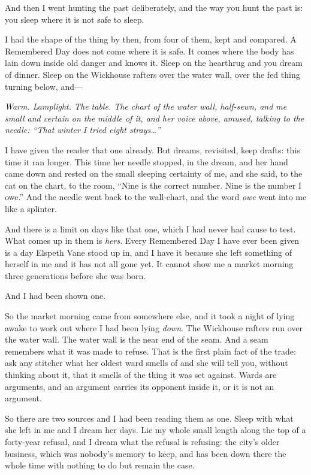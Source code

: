 \scenebreak

And then I went hunting the past deliberately, and the way you hunt the past is: you sleep where it is not safe to sleep.

I had the shape of the thing by then, from four of them, kept and compared. A Remembered Day does not come where it is safe. It comes where the body has lain down inside old danger and knows it. Sleep on the hearthrug and you dream of dinner. Sleep on the Wickhouse rafters over the water wall, over the fed thing turning below, and---

\emph{Warm. Lamplight. The table. The chart of the water wall, half-sewn, and me small and certain on the middle of it, and her voice above, amused, talking to the needle: ``That winter I tried eight strays\ldots''}

I have given the reader that one already. But dreams, revisited, keep drafts: this time it ran longer. This time her needle stopped, in the dream, and her hand came down and rested on the small sleeping certainty of me, and she said, to the cat on the chart, to the room, ``Nine is the correct number. Nine is the number I owe.'' And the needle went back to the wall-chart, and the word \emph{owe} went into me like a splinter.

And there is a limit on days like that one, which I had never had cause to test. What comes up in them is \emph{hers}. Every Remembered Day I have ever been given is a day Elspeth Vane stood up in, and I have it because she left something of herself in me and it has not all gone yet. It cannot show me a market morning three generations before she was born.

And I had been shown one.

So the market morning came from somewhere else, and it took a night of lying awake to work out where I had been lying \emph{down}. The Wickhouse rafters run over the water wall. The water wall is the near end of the seam. And a seam remembers what it was made to refuse. That is the first plain fact of the trade: ask any stitcher what her oldest ward smells of and she will tell you, without thinking about it, that it smells of the thing it was set against. Wards are arguments, and an argument carries its opponent inside it, or it is not an argument.

So there are two sources and I had been reading them as one. Sleep with what she left in me and I dream her days. Lie my whole small length along the top of a forty-year refusal, and I dream what the refusal is refusing: the city's older business, which was nobody's memory to keep, and has been down there the whole time with nothing to do but remain the case.

